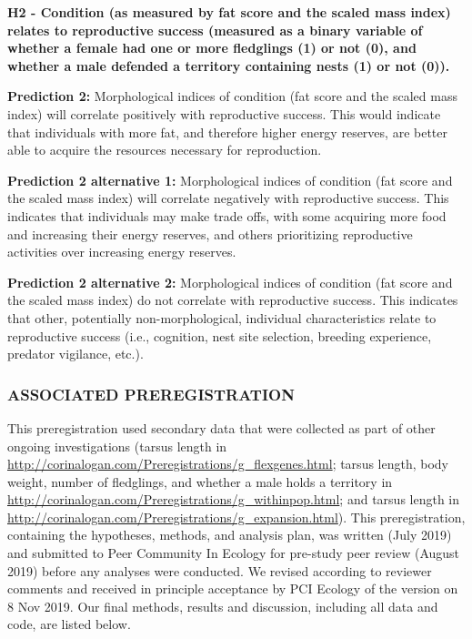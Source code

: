 \documentclass[
]{article}
\begin{document}
\textbf{H2 - Condition (as measured by fat score and the scaled mass
index) relates to reproductive success (measured as a binary variable of
whether a female had one or more fledglings (1) or not (0), and whether
a male defended a territory containing nests (1) or not (0)).}

\textbf{Prediction 2:} Morphological indices of condition (fat score and
the scaled mass index) will correlate positively with reproductive
success. This would indicate that individuals with more fat, and
therefore higher energy reserves, are better able to acquire the
resources necessary for reproduction.

\textbf{Prediction 2 alternative 1:} Morphological indices of condition
(fat score and the scaled mass index) will correlate negatively with
reproductive success. This indicates that individuals may make trade
offs, with some acquiring more food and increasing their energy
reserves, and others prioritizing reproductive activities over
increasing energy reserves.

\textbf{Prediction 2 alternative 2:} Morphological indices of condition
(fat score and the scaled mass index) do not correlate with reproductive
success. This indicates that other, potentially non-morphological,
individual characteristics relate to reproductive success (i.e.,
cognition, nest site selection, breeding experience, predator vigilance,
etc.).

\hypertarget{associated-preregistration}{%
\subsubsection{ASSOCIATED
PREREGISTRATION}\label{associated-preregistration}}

This preregistration used secondary data that were collected as part of
other ongoing investigations (tarsus length in
\url{http://corinalogan.com/Preregistrations/g_flexgenes.html}; tarsus
length, body weight, number of fledglings, and whether a male holds a
territory in
\url{http://corinalogan.com/Preregistrations/g_withinpop.html}; and
tarsus length in
\url{http://corinalogan.com/Preregistrations/g_expansion.html}). This
preregistration, containing the hypotheses, methods, and analysis plan,
was written (July 2019) and submitted to Peer Community In Ecology for
pre-study peer review (August 2019) before any analyses were conducted.
We revised according to reviewer comments and received in principle
acceptance by PCI Ecology of the version on 8 Nov 2019. Our final
methods, results and discussion, including all data and code, are listed
below.
\end{document}
